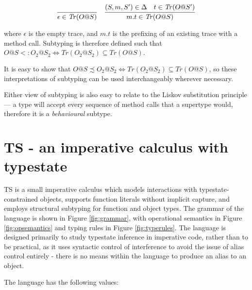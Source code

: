 \documentclass[preprint]{sigplanconf}
\newcommand{\Tr}{\mathit{Tr}}
\newcommand{\figref}[1]{Figure \ref{#1}}
\begin{document}
\[
\begin{tabular}{cc}
\infer{\epsilon \in \Tr(O@S)}{}
&
\infer{m . t \in \Tr(O@S)}
{(S, m, S') \in \Delta & t \in \Tr(O@S')}
\end{tabular}
\]

where $\epsilon$ is the empty trace, and $m . t$ is the 
prefixing of an existing trace with a method call.
Subtyping is therefore defined such that
$O@S <: O_2@S_2 \iff \Tr(O_2@S_2) \subseteq \Tr(O@S)$. 

It is easy to
show that $O@S \precsim O_2@S_2 \iff \Tr(O_2@S_2) \subseteq \Tr(O@S)$, so these
interpretations of subtyping can be used interchangeably wherever necessary.

Either view of subtyping is also easy to relate to the Liskov substitution 
principle \cite{Liskov1987} --- a type will accept every sequence of
method calls that a supertype would, therefore it is a {\it behavioural}
subtype.

\section{TS - an imperative calculus with typestate}

TS is a small imperative calculus which models interactions with 
typestate-constrained objects, supports function literals without 
implicit capture, and employs structural subtyping for function and object
types.
The grammar of the language is shown 
in \figref{fig:grammar}, with operational semantics in \figref{fig:opsemantics} 
and typing rules in \figref{fig:typerules}.
The language is designed primarily
to study typestate inference in imperative code, rather than to 
be practical, as it uses syntactic control of interference \cite{Reynolds1978} 
to avoid the issue of alias control entirely - there is no means within the
language to produce an alias to an object.

The language has the following values:
\end{document}
